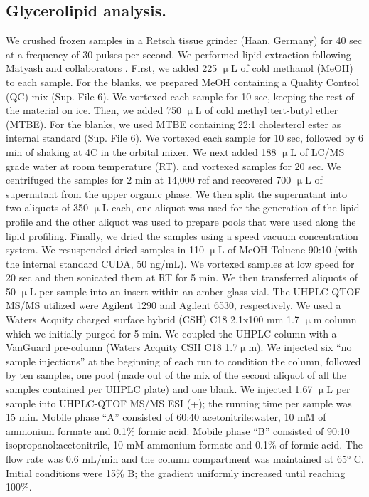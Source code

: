 \documentclass[9pt,twocolumn,twoside,lineno]{biorxiv}
\begin{document}
\subsection{Glycerolipid analysis.} 
We crushed frozen samples in a Retsch tissue grinder (Haan, Germany) for 40 sec at a frequency of 30 pulses per second. 
We performed lipid extraction following Matyash and collaborators \cite{Matyash2008-ue}. 
First, we added 225 $\upmu$L of cold methanol (MeOH) to each sample. 
For the blanks, we prepared MeOH containing a Quality Control (QC) mix (Sup. File 6).
We vortexed each sample for 10 sec, keeping the rest of the material on ice. 
Then, we added 750 $\upmu$L of cold methyl tert-butyl ether (MTBE). 
For the blanks, we used MTBE containing 22:1 cholesterol ester as internal standard (Sup. File 6). 
We vortexed each sample for 10 sec, followed by 6 min of shaking at 4\degree C in the orbital mixer. 
We next added 188 $\upmu$L of LC/MS grade water at room temperature (RT), and vortexed samples for 20 sec.
We centrifuged the samples for 2 min at 14,000 rcf and recovered 700 $\upmu$L of supernatant from the upper organic phase. 
We then split the supernatant into two aliquots of 350 $\upmu$L each, one aliquot was used for the generation of the lipid profile and the other aliquot was used to prepare pools that were used along the lipid profiling. 
Finally, we dried the samples using a speed vacuum concentration system.
We resuspended dried samples in 110 $\upmu$L of MeOH-Toluene 90:10 (with the internal standard CUDA, 50 ng/mL). 
We vortexed samples at low speed for 20 sec and then sonicated them at RT for 5 min. 
We then transferred aliquots of 50 $\upmu$L per sample into an insert within an amber glass vial.
The UHPLC-QTOF MS/MS utilized were Agilent 1290 and Agilent 6530, respectively. 
We used a Waters Acquity charged surface hybrid (CSH) C18 2.1x100 mm 1.7 $\upmu$m column which we initially purged for 5 min. 
We coupled the UHPLC column with a VanGuard pre-column (Waters Acquity CSH C18 1.7$\upmu$m). 
We injected six “no sample injections” at the beginning of each run to condition the column, followed by ten samples, one pool (made out of the mix of the second aliquot of all the samples contained per UHPLC plate) and one blank.
We injected 1.67 $\upmu$L per sample into UHPLC-QTOF MS/MS ESI (+); the running time per sample was 15 min. 
Mobile phase “A” consisted of 60:40 acetonitrile:water, 10 mM of ammonium formate and 0.1\% formic acid. 
Mobile phase “B” consisted of 90:10 isopropanol:acetonitrile, 10 mM ammonium formate and 0.1\% of formic acid. 
The flow rate was 0.6 mL/min and the column compartment was maintained at 65° C. Initial conditions were 15\% B; the gradient uniformly increased until reaching 100\%. 
\end{document}
